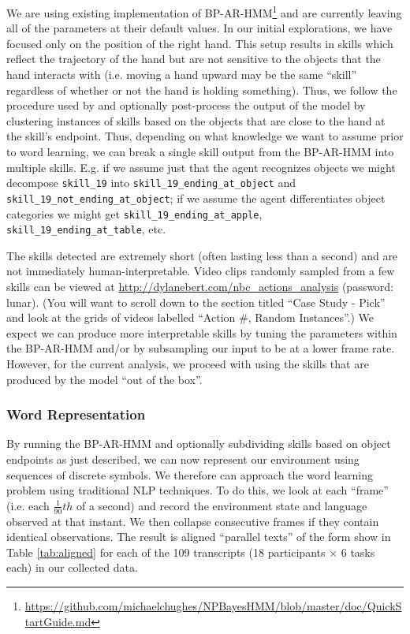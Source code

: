 \documentclass[11pt]{article}
\begin{document}
We are using existing implementation of BP-AR-HMM\footnote{\url{https://github.com/michaelchughes/NPBayesHMM/blob/master/doc/QuickStartGuide.md}} and are currently leaving all of the parameters at their default values. In our initial explorations, we have focused only on the position of the right hand. This setup results in skills which reflect the trajectory of the hand but are not sensitive to the objects that the hand interacts with (i.e. moving a hand upward may be the same ``skill'' regardless of whether or not the hand is holding something). Thus, we follow the procedure used by \cite{konidaris2012robot} and optionally post-process the output of the model by clustering instances of skills based on the objects that are close to the hand at the skill's endpoint. Thus, depending on what knowledge we want to assume prior to word learning, we can break a single skill output from the BP-AR-HMM into multiple skills. E.g. if we assume just that the agent recognizes objects we might decompose \texttt{skill\_19} into \texttt{skill\_19\_ending\_at\_object} and \texttt{skill\_19\_not\_ending\_at\_object};  if we assume the agent differentiates object categories we might get \texttt{skill\_19\_ending\_at\_apple},  \texttt{skill\_19\_ending\_at\_table}, etc. 

The skills detected are extremely short (often lasting less than a second) and are not immediately human-interpretable. Video clips randomly sampled from a few skills can be viewed at  \url{http://dylanebert.com/nbc_actions_analysis} (password: lunar). (You will want to scroll down to the section titled ``Case Study  -  Pick'' and look at the grids of videos labelled ``Action \#, Random Instances''.) We expect we can produce more interpretable skills by tuning the parameters within the BP-AR-HMM and/or by subsampling our input to be at a lower frame rate. However, for the current analysis, we proceed with using the skills that are produced by the model ``out of the box''. 

\subsubsection{Word Representation}

By running the BP-AR-HMM and optionally subdividing skills based on object endpoints as just described, we can now represent our environment using sequences of discrete symbols. We therefore can approach the word learning problem using traditional NLP techniques. To do this, we look at each ``frame'' (i.e. each $\frac{1}{90}th$ of a second) and record the environment state and language observed at that instant. We then collapse consecutive frames if they contain identical observations. The result is aligned ``parallel texts'' of the form show in Table \ref{tab:aligned} for each of the 109 transcripts (18 participants $\times$ 6 tasks each) in our collected data. 
\end{document}
